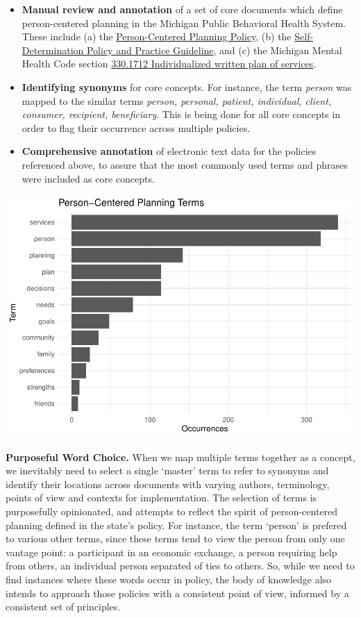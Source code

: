 \documentclass[
]{book}
\providecommand{\tightlist}{%
  \setlength{\itemsep}{0pt}\setlength{\parskip}{0pt}}
\begin{document}
\begin{itemize}
\tightlist
\item
  \textbf{Manual review and annotation} of a set of core documents which define person-centered planning in the Michigan Public Behavioral Health System. These include (a) the \href{https://www.michigan.gov/documents/mdhhs/Person_Centered_Planning_Policy_rev._6-17-17_597318_7.pdf}{Person-Centered Planning Policy}, (b) the \href{https://www.michigan.gov/documents/SelfDeterminationPolicy_70262_7.pdf}{Self-Determination Policy and Practice Guideline}, and (c) the Michigan Mental Health Code section \href{http://legislature.mi.gov/doc.aspx?mcl-330-1712}{330.1712 Individualized written plan of services}.
\item
  \textbf{Identifying synonyms} for core concepts. For instance, the term \emph{person} was mapped to the similar terms \emph{person, personal, patient, individual, client, consumer, recipient, beneficiary}. This is being done for all core concepts in order to flag their occurrence across multiple policies.
\item
  \textbf{Comprehensive annotation} of electronic text data for the policies referenced above, to assure that the most commonly used terms and phrases were included as core concepts.
\end{itemize}

\includegraphics{person_centered_files/figure-latex/plot_concept-1.pdf}

\textbf{Purposeful Word Choice.} When we map multiple terms together as a concept, we inevitably need to select a single `master' term to refer to synonyms and identify their locations across documents with varying authors, terminology, points of view and contexts for implementation. The selection of terms is purposefully opinionated, and attempts to reflect the spirit of person-centered planning defined in the state's policy. For instance, the term `person' is prefered to various other terms, since these terms tend to view the person from only one vantage point: a participant in an economic exchange, a person requiring help from others, an individual person separated of ties to others. So, while we need to find instances where these words occur in policy, the body of knowledge also intends to approach those policies with a consistent point of view, informed by a consistent set of principles.
\end{document}
